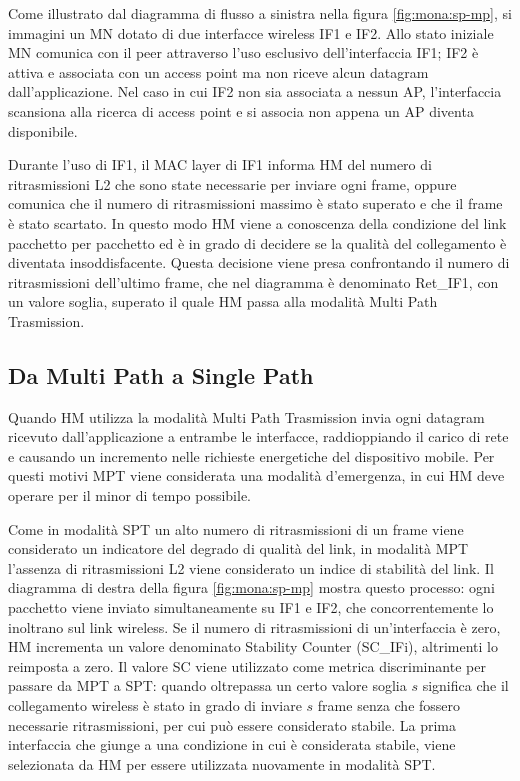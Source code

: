 \documentclass[12pt,a4paper,openright,twoside]{book}
\begin{document}
Come illustrato dal diagramma di flusso a sinistra nella figura
\ref{fig:mona:sp-mp}, si immagini un MN dotato di due interfacce
wireless IF1 e IF2. Allo stato iniziale MN comunica con il peer
attraverso l'uso esclusivo dell'interfaccia IF1; IF2 è attiva e
associata con un access point ma non riceve alcun datagram
dall'applicazione. Nel caso in cui IF2 non sia associata a nessun AP,
l'interfaccia scansiona alla ricerca di access point e si associa non
appena un AP diventa disponibile.

Durante l'uso di IF1, il MAC layer di IF1 informa HM del numero di
ritrasmissioni L2 che sono state necessarie per inviare ogni frame,
oppure comunica che il numero di ritrasmissioni massimo è stato
superato e che il frame è stato scartato. In questo modo HM viene a
conoscenza della condizione del link pacchetto per pacchetto ed è in
grado di decidere se la qualità del collegamento è diventata
insoddisfacente. Questa decisione viene presa confrontando il numero
di ritrasmissioni dell'ultimo frame, che nel diagramma è denominato
Ret\_IF1, con un valore soglia, superato il quale HM passa alla
modalità Multi Path Trasmission.

\subsection{Da Multi Path a Single Path}

Quando HM utilizza la modalità Multi Path Trasmission invia ogni
datagram ricevuto dall'applicazione a entrambe le interfacce,
raddioppiando il carico di rete e causando un incremento nelle
richieste energetiche del dispositivo mobile. Per questi motivi MPT
viene considerata una modalità d'emergenza, in cui HM deve operare per
il minor di tempo possibile.

Come in modalità SPT un alto numero di ritrasmissioni di un frame
viene considerato un indicatore del degrado di qualità del link, in
modalità MPT l'assenza di ritrasmissioni L2 viene considerato un
indice di stabilità del link. Il diagramma di destra della figura
\ref{fig:mona:sp-mp} mostra questo processo: ogni pacchetto viene
inviato simultaneamente su IF1 e IF2, che concorrentemente lo
inoltrano sul link wireless. Se il numero di ritrasmissioni di
un'interfaccia è zero, HM incrementa un valore denominato Stability
Counter (SC\_IFi), altrimenti lo reimposta a zero. Il valore SC viene
utilizzato come metrica discriminante per passare da MPT a SPT: quando
oltrepassa un certo valore soglia $s$ significa che il collegamento
wireless è stato in grado di inviare $s$ frame senza che fossero
necessarie ritrasmissioni, per cui può essere considerato stabile. La
prima interfaccia che giunge a una condizione in cui è considerata
stabile, viene selezionata da HM per essere utilizzata nuovamente in
modalità SPT.
\end{document}

